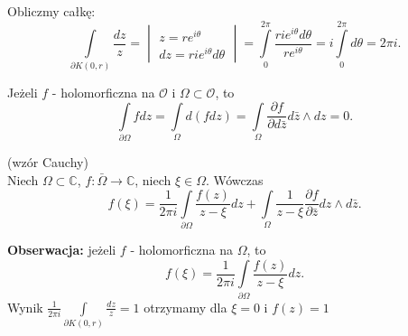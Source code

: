 \documentclass[../main.tex]{subfiles}
\begin{document}
\begin{przyklad}
    Obliczmy całkę:
    \[
        \int\limits_{\partial K(0,r)} \frac{dz}{z} = \begin{vmatrix} z = re^{i\theta}\\ dz = rie^{i\theta}d\theta \end{vmatrix} = \int\limits_0^{2\pi} \frac{rie^{i\theta}d\theta}{re^{i\theta}} = i \int\limits_0^{2\pi}d\theta = 2\pi i
    .\]
\end{przyklad}
\begin{stw}
    Jeżeli $f$ - holomorficzna na $\mathcal{O}$ i $\Omega \subset\mathcal{O}$, to
    \[
        \int\limits_{\partial \Omega} fdz = \int\limits_\Omega d(fdz) = \int\limits_{\Omega} \frac{\partial f}{\partial d\bar{z}} d\bar{z}\land dz = 0
    .\]
\end{stw}
\begin{tw}
    (wzór Cauchy)\\
    Niech $\Omega\subset\mathbb{C}$, $f: \bar{\Omega} \to \mathbb{C}$, niech $\xi \in \Omega$. Wówczas  \[
        f(\xi) = \frac{1}{2\pi i }\int\limits_{\partial \Omega}\frac{f(z)}{z-\xi}dz + \int\limits_{\Omega} \frac{1}{z - \xi}\frac{\partial f}{\partial \bar{z}} dz\land d\bar{z}
    .\]
\end{tw}
\textbf{Obserwacja:} jeżeli $f$ - holomorficzna na $\Omega$, to
\[
    f(\xi) = \frac{1}{2\pi i} \int\limits_{\partial \Omega}\frac{f(z)}{z - \xi} dz
.\]
Wynik $\frac{1}{2\pi i }\int\limits_{\partial K(0,r)} \frac{dz}{z} = 1$ otrzymamy dla $\xi = 0$ i $f(z) = 1$
\end{document}
